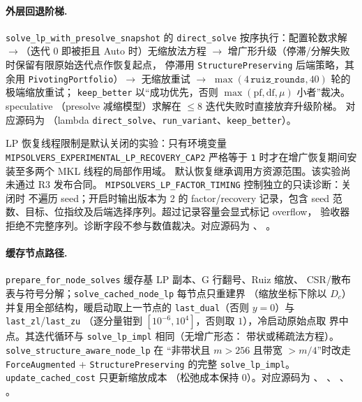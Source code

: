 \paragraph{外层回退阶梯.}
\texttt{solve\_lp\_with\_presolve\_snapshot} 的 \texttt{direct\_solve}
按序执行：配置轮数求解 $\to$（迭代 $0$ 即被拒且 Auto 时）无缩放法方程
$\to$ 增广形升级（停滞/分解失败时保留有限原始迭代点作恢复起点，
停滞用 \texttt{StructurePreserving} 后端策略，其余用
\texttt{PivotingPortfolio}）$\to$ 无缩放重试 $\to$
$\max(4\,\texttt{ruiz\_rounds}, 40)$ 轮的极端缩放重试；
\texttt{keep\_better} 以``成功优先，否则
$\max(\mathrm{pf}, \mathrm{df}, \mu)$ 小者''裁决。speculative
（presolve 减缩模型）求解在 $\le 8$ 迭代失败时直接放弃升级阶梯。
对应源码为 
（lambda \texttt{direct\_solve}、\texttt{run\_variant}、\texttt{keep\_better}）。

LP 恢复线程限制是默认关闭的实验：只有环境变量
\texttt{MIPSOLVERS\_EXPERIMENTAL\_LP\_RECOVERY\_CAP2} 严格等于
\texttt{1} 时才在增广恢复期间安装至多两个 MKL 线程的局部作用域。
默认恢复继承调用方资源范围。该实验尚未通过 R3 发布合同。
\texttt{MIPSOLVERS\_LP\_FACTOR\_TIMING} 控制独立的只读诊断：关闭时
不遍历 seed；开启时输出版本为 2 的 factor/recovery 记录，包含 seed
范数、目标、位指纹及后端选择序列。超过记录容量会显式标记 overflow，
验收器拒绝不完整序列。诊断字段不参与数值裁决。对应源码为
、
。

\paragraph{缓存节点路径.}
\texttt{prepare\_for\_node\_solves} 缓存基 LP 副本、G 行翻号、Ruiz 缩放、
CSR/散布表与符号分解；\texttt{solve\_cached\_node\_lp} 每节点只重建界
（缩放坐标下除以 $D_c$）并复用全部结构，暖启动取上一节点的
\texttt{last\_dual}（否则 $y = 0$）与 \texttt{last\_zl}/\texttt{last\_zu}
（逐分量钳到 $[10^{-6}, 10^{4}]$，否则取 $1$），冷启动原始点取
界中点。其迭代循环与 \texttt{solve\_lp\_impl} 相同（无增广形态：
带状或稀疏法方程）。\texttt{solve\_structure\_aware\_node\_lp} 在
``非带状且 $m > 256$ 且带宽 $> m/4$''时改走
\texttt{ForceAugmented} + \texttt{StructurePreserving} 的完整
\texttt{solve\_lp\_impl}。\texttt{update\_cached\_cost} 只更新缩放成本
（松弛成本保持 $0$）。对应源码为
、
、
、
。

